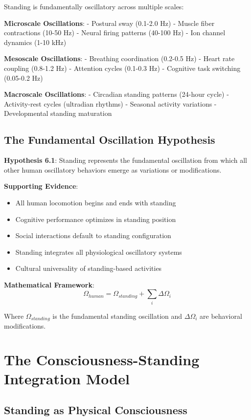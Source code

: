 \documentclass[12pt]{article}
\begin{document}
Standing is fundamentally oscillatory across multiple scales:

\textbf{Microscale Oscillations}:
- Postural sway (0.1-2.0 Hz)
- Muscle fiber contractions (10-50 Hz)
- Neural firing patterns (40-100 Hz)
- Ion channel dynamics (1-10 kHz)

\textbf{Mesoscale Oscillations}:
- Breathing coordination (0.2-0.5 Hz)
- Heart rate coupling (0.8-1.2 Hz)
- Attention cycles (0.1-0.3 Hz)
- Cognitive task switching (0.05-0.2 Hz)

\textbf{Macroscale Oscillations}:
- Circadian standing patterns (24-hour cycle)
- Activity-rest cycles (ultradian rhythms)
- Seasonal activity variations
- Developmental standing maturation

\subsection{The Fundamental Oscillation Hypothesis}

\textbf{Hypothesis 6.1}: Standing represents the fundamental oscillation from which all other human oscillatory behaviors emerge as variations or modifications.

\textbf{Supporting Evidence}:
\begin{itemize}
\item All human locomotion begins and ends with standing
\item Cognitive performance optimizes in standing position
\item Social interactions default to standing configuration
\item Standing integrates all physiological oscillatory systems
\item Cultural universality of standing-based activities
\end{itemize}

\textbf{Mathematical Framework}:
$$\Omega_{human} = \Omega_{standing} + \sum_{i} \Delta\Omega_i$$

Where $\Omega_{standing}$ is the fundamental standing oscillation and $\Delta\Omega_i$ are behavioral modifications.

\section{The Consciousness-Standing Integration Model}

\subsection{Standing as Physical Consciousness}
\end{document}
